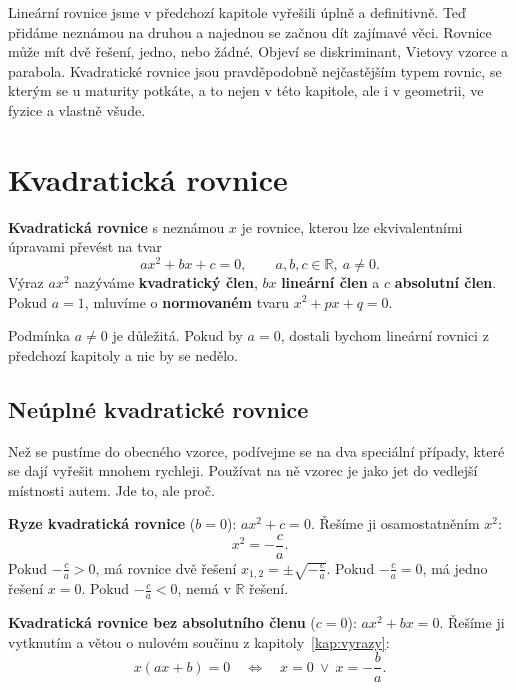 \label{kap:kvadraticke}

Lineární rovnice jsme v předchozí kapitole vyřešili úplně a definitivně. Teď přidáme neznámou na druhou a najednou se začnou dít zajímavé věci. Rovnice může mít dvě řešení, jedno, nebo žádné. Objeví se diskriminant, Vietovy vzorce a parabola. Kvadratické rovnice jsou pravděpodobně nejčastějším typem rovnic, se kterým se u maturity potkáte, a to nejen v této kapitole, ale i v geometrii, ve fyzice a vlastně všude.

\section{Kvadratická rovnice}

\begin{definitionbox}
  \textbf{Kvadratická rovnice} s neznámou $x$ je rovnice, kterou lze ekvivalentními úpravami převést na tvar
  \begin{equation*}
    ax^2 + bx + c = 0,\qquad a, b, c\in\mathbb{R},\ a\neq 0.
  \end{equation*}
  Výraz $ax^2$ nazýváme \textbf{kvadratický člen}, $bx$ \textbf{lineární člen} a $c$ \textbf{absolutní člen}. Pokud $a = 1$, mluvíme o \textbf{normovaném} tvaru $x^2 + px + q = 0$.
\end{definitionbox}

Podmínka $a\neq 0$ je důležitá. Pokud by $a = 0$, dostali bychom lineární rovnici z předchozí kapitoly a nic by se nedělo.

\subsection{Neúplné kvadratické rovnice}\label{sec:neuplne-kvadraticke}

Než se pustíme do obecného vzorce, podívejme se na dva speciální případy, které se dají vyřešit mnohem rychleji. Používat na ně vzorec je jako jet do vedlejší místnosti autem. Jde to, ale proč.

\begin{definitionbox}
  \textbf{Ryze kvadratická rovnice} ($b = 0$): $ax^2 + c = 0$. Řešíme ji osamostatněním $x^2$:
  \begin{equation*}
    x^2 = -\frac{c}{a}.
  \end{equation*}
  Pokud $-\frac{c}{a} > 0$, má rovnice dvě řešení $x_{1,2} = \pm\sqrt{-\frac{c}{a}}$. Pokud $-\frac{c}{a} = 0$, má jedno řešení $x = 0$. Pokud $-\frac{c}{a} < 0$, nemá v $\mathbb{R}$ řešení.

  \vspace{0.2cm}

  \textbf{Kvadratická rovnice bez absolutního členu} ($c = 0$): $ax^2 + bx = 0$. Řešíme ji vytknutím a větou o nulovém součinu z kapitoly~\ref{kap:vyrazy}:
  \begin{equation*}
    x(ax + b) = 0\quad\Leftrightarrow\quad x = 0\ \lor\ x = -\frac{b}{a}.
  \end{equation*}
\end{definitionbox}

